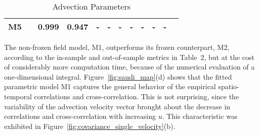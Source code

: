\documentclass[12pt]{article}
\newcommand{\0}{\mathbf{0}}
\begin{document}
\begin{table}[t!]
{\begin{tabular}{cccccccccccc}
M5 & &  0.999 & 0.947 &- & - & -& -&- & - & - \\
\bottomrule 
\end{tabular}
}
\label{tab:estimates}
\bigskip
\caption*{\small Advection Parameters}
\end{table}

The non-frozen field model, M1, outperforms its frozen counterpart, M2, according to the in-sample and out-of-sample metrics in Table~2, but at the cost of considerably more computation time, because of the numerical evaluation of a one-dimensional integral. Figure~\ref{fig:saudi_map}(d) shows that the fitted parametric model M1 captures the general behavior of the empirical spatio-temporal correlations and cross-correlation. This is not surprising, since the variability of the advection velocity vector brought about the decrease in correlations and cross-correlation with increasing $u$. This characteristic was exhibited in Figure~\ref{fig:covariance_single_velocity}(b). 
\end{document}
